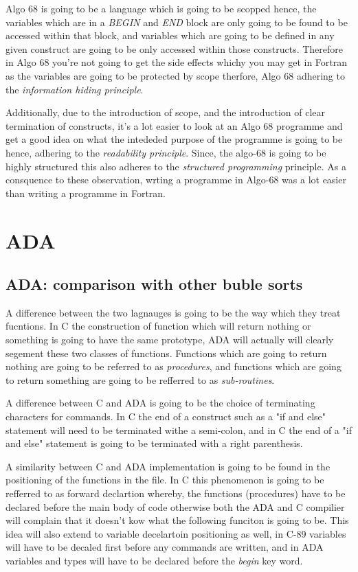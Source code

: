 \documentclass[
	12pt, %
]{fphw}
\begin{document}
Algo 68 is going to be a language which is going to be scopped hence, the
variables which are in a \emph{BEGIN} and \emph{END} block are only going to be
found to be accessed within that block, and variables which are going to be defined
in any given construct are going to be only accessed within those constructs.
Therefore in Algo 68 you're not going to get the side effects whichy you may get in
Fortran as the variables are going to be protected by scope therfore, Algo 68
adhering to the \emph{information hiding principle}. \par

Additionally, due to the introduction of scope, and the introduction of clear
termination of constructs, it's a lot easier to look at an Algo 68 programme and
get a good idea on what the intededed purpose of the programme is going to be
hence, adhering to the \emph{readability principle}. Since, the algo-68 is going
to be highly structured this also adheres to the \emph{structured programming}
principle. As a consquence to these observation, wrting a programme in Algo-68
was a lot easier than writing a programme in Fortran.

\section{ADA}
\subsection{ADA: comparison with other buble sorts}
A difference between the two lagnauges is going to be the way which they treat
fucntions. In C the construction of function which will return nothing or something
is going to have the same prototype, ADA will actually will clearly segement these
two classes of functions. Functions which are going to return nothing are going
to be referred to as \emph{procedures}, and functions which are going to return
something are going to be refferred to as \emph{sub-routines}. \par

A difference between C and ADA is going to be the choice of terminating characters
for commands. In C the end of a construct such as a "if and else" statement will
need to be terminated withe a semi-colon, and in C the end of a "if and else"
statement is going to be terminated with a right parenthesis.\par

A similarity between C and ADA implementation is going to be found in the
positioning of the functions in the file. In C this phenomenon is going to be
refferred to as forward declartion whereby, the functions (procedures) have to
be declared before the main body of code otherwise both the ADA and C compilier
will complain that it doesn't kow what the following funciton is going to be. This
idea will also extend to variable decelartoin positioning as well, in C-89
variables will have to be decaled first before any commands are written, and in
ADA variables and types will have to be declared before the \emph{begin} key word.\par
\end{document}
